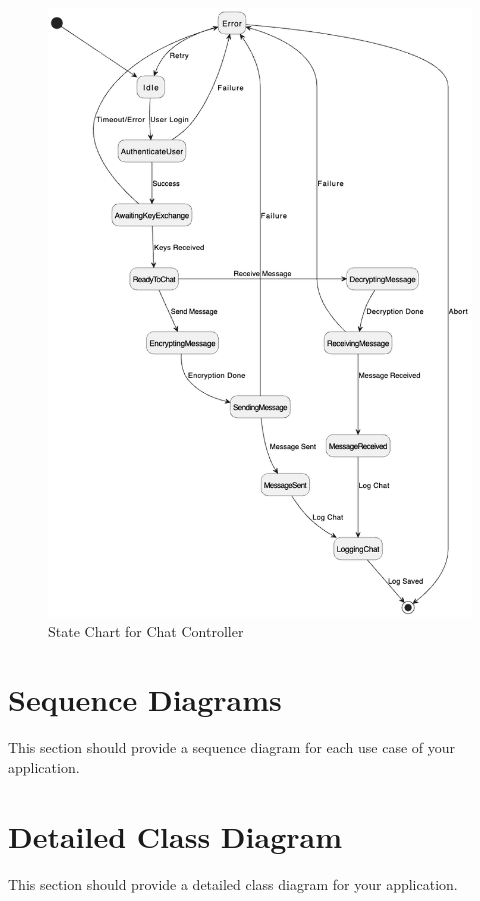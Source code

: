 \documentclass[]{article}
\begin{document}
\begin{figure}[H]
	\centering
	\includegraphics[width=1\textwidth]{chat_controller.drawio.png}
	\caption{State Chart for Chat Controller}
\end{figure}

\section{Sequence Diagrams}
\label{sec:sequence_diagrams}
This section should provide a sequence diagram for each use case of your application.

\section{Detailed Class Diagram}
\label{sec:detailed_class_diagram}
This section should provide a detailed class diagram for your application.
\end{document}
